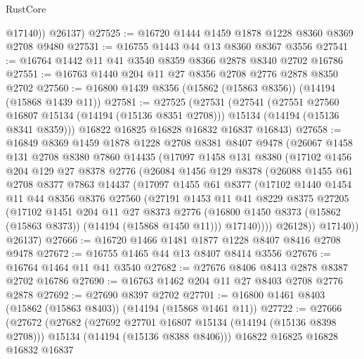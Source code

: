\begin{lexlean}{RustCore}
\begin{coremodule}
          @17140))
      @26137)
@27525 := @16720 @1444 @1459 @1878 @1228 @8360 @8369 @2708 @9480
@27531 := @16755 @1443 @44 @13 @8360 @8367 @3556
@27541 := @16764 @1442 @11 @41 @3540 @8359 @8366 @2878 @8340 @2702 @16786
@27551 := @16763 @1440 @204 @11 @27 @8356 @2708 @2776 @2878 @8350 @2702
@27560 := @16800 @1439 @8356 (@15862 (@15863 @8356)) (@14194 (@15868 @1439 @11))
@27581 := @27525
    (@27531
      (@27541
        (@27551 @27560 @16807 @15134 (@14194 (@15136 @8351 @2708)))
        @15134
        (@14194 (@15136 @8341 @8359)))
      @16822
      @16825
      @16828
      @16832
      @16837
      @16843)
@27658 := @16849
    @8369
    @1459
    @1878
    @1228
    @2708
    @8381
    @8407
    @9478
    (@26067
      @1458
      @131
      @2708
      @8380
      @7860
      @14435
      (@17097
        @1458
        @131
        @8380
        (@17102
          @1456
          @204
          @129
          @27
          @8378
          @2776
          (@26084
            @1456
            @129
            @8378
            (@26088
              @1455
              @61
              @2708
              @8377
              @7863
              @14437
              (@17097
                @1455
                @61
                @8377
                (@17102
                  @1440
                  @1454
                  @11
                  @44
                  @8356
                  @8376
                  @27560
                  (@27191
                    @1453
                    @11
                    @41
                    @8229
                    @8375
                    @27205
                    (@17102
                      @1451
                      @204
                      @11
                      @27
                      @8373
                      @2776
                      (@16800 @1450 @8373 (@15862 (@15863 @8373)) (@14194 (@15868 @1450 @11)))
                      @17140))))
              @26128))
          @17140))
      @26137)
@27666 := @16720 @1466 @1481 @1877 @1228 @8407 @8416 @2708 @9478
@27672 := @16755 @1465 @44 @13 @8407 @8414 @3556
@27676 := @16764 @1464 @11 @41 @3540
@27682 := @27676 @8406 @8413 @2878 @8387 @2702 @16786
@27690 := @16763 @1462 @204 @11 @27 @8403 @2708 @2776 @2878
@27692 := @27690 @8397 @2702
@27701 := @16800 @1461 @8403 (@15862 (@15863 @8403)) (@14194 (@15868 @1461 @11))
@27722 := @27666
    (@27672
      (@27682
        (@27692 @27701 @16807 @15134 (@14194 (@15136 @8398 @2708)))
        @15134
        (@14194 (@15136 @8388 @8406)))
      @16822
      @16825
      @16828
      @16832
      @16837

\end{coremodule}
\end{lexlean}
